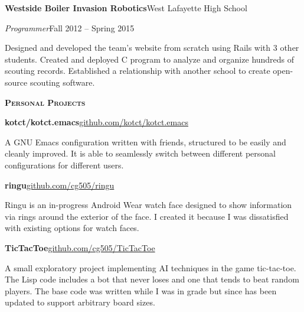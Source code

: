 \documentclass[11pt]{article}
\newcommand{\sectionfont}{\Large\scshape\bfseries\color{cg505green}}
\newcommand{\impact}[1]{\textcolor{cg505green}{\nohyphens{#1}}}
\begin{document}
\begin{minipage}[t]{0.67\textwidth}
  \textbf{Westside Boiler Invasion Robotics}\hfill West Lafayette High School
  \begin{adjustwidth}{10pt}{}
    \emph{Programmer}\hfill Fall 2012 -- Spring 2015

    Designed and developed the team's \impact{website from scratch} using Rails with 3 other students.
    Created and deployed C program to analyze and organize \impact{hundreds of scouting records}.
    Established a relationship with another school to create open-source scouting software.
  \end{adjustwidth}

  \vspace{5pt}

  {\sectionfont Personal Projects}

  \textbf{kotct/kotct.emacs}\hfill\href{https://github.com/kotct/kotct.emacs/}{github.com/kotct/kotct.emacs}
  \begin{adjustwidth}{10pt}{}
    A GNU Emacs configuration written with friends, structured to be easily and cleanly improved.
    It is able to seamlessly switch between different personal configurations for different users.
  \end{adjustwidth}

  \textbf{ringu}\hfill\href{https://github.com/cg505/ringu/}{github.com/cg505/ringu}
  \begin{adjustwidth}{10pt}{}
    Ringu is an in-progress Android Wear watch face designed to show information via rings around the exterior of the face.
    I created it because I was dissatisfied with existing options for watch faces.
  \end{adjustwidth}

  \textbf{TicTacToe}\hfill\href{https://github.com/cg505/TicTacToe/}{github.com/cg505/TicTacToe}
  \begin{adjustwidth}{10pt}{}
    A small exploratory project implementing AI techniques in the game tic-tac-toe.
    The Lisp code includes a bot that never loses and one that tends to beat random players.
    The base code was written while I was in  grade but since has been updated to support arbitrary board sizes.
  \end{adjustwidth}
\end{minipage}
\end{document}
